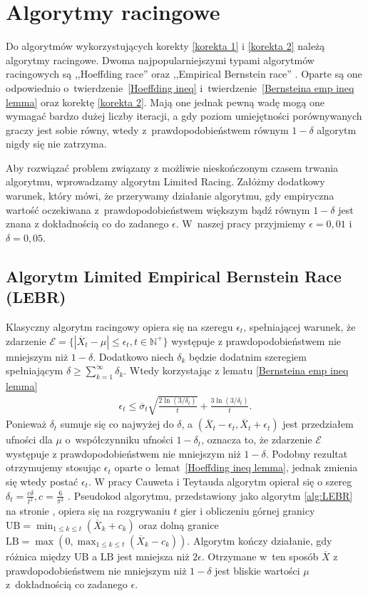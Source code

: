 \documentclass[inzynierska]{pwr_wmat_praca_dyplomowa}
\theoremstyle{plain}
\numberwithin{theorem}{chapter}
\theoremstyle{definition}
\numberwithin{theorem}{chapter}
\begin{document}
	\chapter{Algorytmy racingowe}
	Do algorytmów wykorzystujących korekty \ref{korekta 1} i \ref{korekta 2} należą algorytmy racingowe. Dwoma najpopularniejszymi typami algorytmów racingowych są ,,Hoeffding race'' \cite{Maron-1993-15969} oraz ,,Empirical Bernstein race'' \cite{Mnih_2008}.
	Oparte są one odpowiednio o~twierdzenie~\ref{Hoeffding ineq} i~twierdzenie~\ref{Bernsteina emp ineq lemma} oraz korektę \ref{korekta 2}. Mają one jednak pewną wadę \pauza mogą one wymagać bardzo dużej liczby iteracji, a gdy poziom umiejętności porównywanych graczy jest sobie równy, wtedy z~prawdopodobieństwem równym $1-\delta$ algorytm nigdy się nie zatrzyma.
	
	Aby rozwiązać problem związany z możliwie nieskończonym czasem trwania algorytmu, wprowadzamy algorytm Limited Racing. Załóżmy dodatkowy warunek, który mówi, że przerywamy działanie algorytmu, gdy empiryczna wartość oczekiwana z~prawdopodobieństwem większym bądź równym $1-\delta$ jest znana z dokładnością co do zadanego $\epsilon$. W~naszej pracy przyjmiemy $\epsilon=0,01$ i $\delta = 0,05$.
	\section[Algorytm Limited Empirical Bernstein Race (LEBR)]{Algorytm Limited Empirical Bernstein Race \\(LEBR)}
	Klasyczny algorytm racingowy opiera się na szeregu $\epsilon_t$, spełniającej warunek, że zdarzenie $\mathcal{E}= \{|\overline{X}_t - \mu | \le \epsilon_t,  t\in \mathbb{N}^+\}$ występuje z prawdopodobieństwem nie mniejszym niż $1-\delta$. Dodatkowo niech $\delta_k$ będzie dodatnim szeregiem spełniającym $ \delta \ge \sum_{k = 1}^{\infty}\delta_k$. Wtedy korzystając z lematu \ref{Bernsteina emp ineq lemma}
	\begin{gather*}
		\epsilon_t \le  \overline{\sigma}_t \sqrt{\frac{2\ln(3/\delta_t)}{t}} + \frac{3  \ln{(3 / \delta_t)}}{t}.
	\end{gather*}
	\noindent
	Ponieważ $\delta_t$ sumuje się co najwyżej do $\delta$, a $(\overline{X}_t - \epsilon_t, \overline{X}_t + \epsilon_t)$ jest przedziałem ufności dla $\mu$ o~współczynniku ufności $1-\delta_t$, oznacza to, że zdarzenie $\mathcal{E}$ występuje z prawdopodobieństwem nie mniejszym niż $1-\delta$. Podobny rezultat otrzymujemy stosując $\epsilon_t$ oparte o~lemat~\ref{Hoeffding ineq lemma}, jednak zmienia się wtedy postać $\epsilon_t$. W pracy Cauweta i Teytauda algorytm opierał się o szereg $\delta_t=\frac{c\delta}{t^2}, c=\frac{6}{\pi^2}$ \cite{cauwet2018surprising}.
	Pseudokod algorytmu, przedstawiony jako algorytm \ref{alg:LEBR} na stronie \pageref{alg:LEBR}, opiera się na rozgrywaniu $t$ gier i obliczeniu górnej granicy $\text{UB} = \min_{1\le k\le t}( \overline{X}_k+c_k)$ oraz dolną granice $\text{LB} = \max(0, \max_{1\le k\le t}(\overline{X}_k-c_k))$. Algorytm kończy działanie, gdy różnica między $\text{UB}$ a $\text{LB}$ jest mniejsza niż $2\epsilon$. Otrzymane w~ten sposób $\overline{X}$ z prawdopodobieństwem nie mniejszym niż $1 - \delta$ jest bliskie wartości $\mu$ z~dokładnością co zadanego $\epsilon$.
\end{document}
